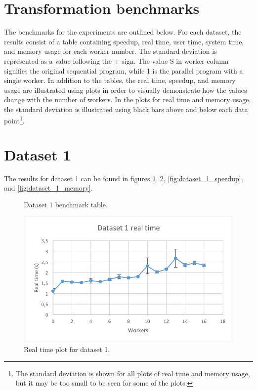 \section{Transformation benchmarks}
The benchmarks for the experiments are outlined below. For each dataset, the results consist of a table containing
speedup, real time, user time, system time, and memory usage for each worker number. The standard deviation is represented
as a value following the $\pm$ sign. The value S in worker column signifies the original sequential program, while 1 is the
parallel program with a single worker. In addition to the tables, the real time, speedup, and memory usage are illustrated
using plots in order to visually demonstrate how the values change with the number of workers. In the plots for real time
and memory usage, the standard deviation is illustrated using black bars above and below each data point\footnote{
The standard deviation is shown for all plots of real time and memory usage, but it may be too small to be seen for some of the plots.}.

\section{Dataset 1}
The results for dataset 1 can be found in figures \ref{fig:dataset_1_table}, \ref{fig:dataset_1_real_time}, \ref{fig:dataset_1_speedup}, and \ref{fig:dataset_1_memory}.

\begin{figure}[ht]
\centering
{}
\caption[Dataset 1 benchmark table.]{Dataset 1 benchmark table.}
\label{fig:dataset_1_table}
\end{figure}

\begin{figure}[ht]
  \centering
  \includegraphics[width=120mm]{figures/dataset_1/dataset_1_real_time.png}
  \caption[Real time plot for dataset 1.]{Real time plot for dataset 1.}
  \label{fig:dataset_1_real_time}
\end{figure}

